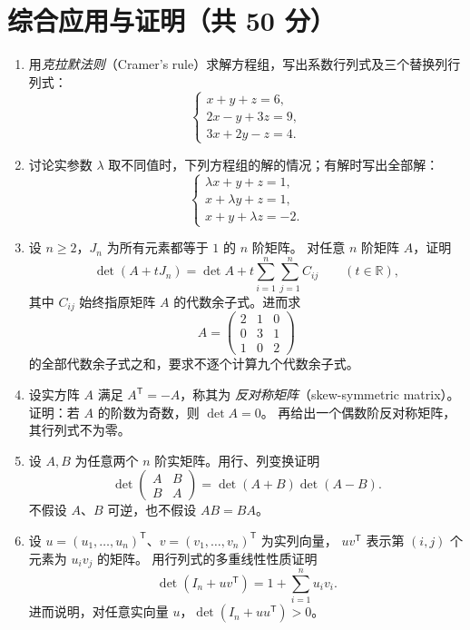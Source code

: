 \documentclass[UTF8,12pt,a4paper,fontset=fandol]{ctexart}
\begin{document}
\section{综合应用与证明（共 50 分）}
\begin{enumerate}[label=\arabic*.,resume=detquestions]

\item\label{q:cramer}
用\emph{克拉默法则}（Cramer's rule）求解方程组，写出系数行列式及三个替换列行列式：
\[
\begin{cases}
x+y+z=6,\\
2x-y+3z=9,\\
3x+2y-z=4.
\end{cases}
\]

\item\label{q:parameter-system}
讨论实参数 $\lambda$ 取不同值时，下列方程组的解的情况；有解时写出全部解：
\[
\begin{cases}
\lambda x+y+z=1,\\
x+\lambda y+z=1,\\
x+y+\lambda z=-2.
\end{cases}
\]

\item\label{q:all-cofactors}
设 $n\geq2$，$J_n$ 为所有元素都等于 $1$ 的 $n$ 阶矩阵。
对任意 $n$ 阶矩阵 $A$，证明
\[
\det(A+tJ_n)=\det A+t\sum_{i=1}^n\sum_{j=1}^n C_{ij}
\qquad(t\in\mathbb R),
\]
其中 $C_{ij}$ 始终指原矩阵 $A$ 的代数余子式。进而求
\[
A=\begin{pmatrix}2&1&0\\0&3&1\\1&0&2\end{pmatrix}
\]
的全部代数余子式之和，要求不逐个计算九个代数余子式。

\item\label{q:skew-symmetric}
设实方阵 $A$ 满足 $A^{\mathsf T}=-A$，称其为
\emph{反对称矩阵}（skew-symmetric matrix）。
证明：若 $A$ 的阶数为奇数，则 $\det A=0$。
再给出一个偶数阶反对称矩阵，其行列式不为零。

\item\label{q:block-determinant}
设 $A,B$ 为任意两个 $n$ 阶实矩阵。用行、列变换证明
\[
\det\begin{pmatrix}A&B\\B&A\end{pmatrix}
=\det(A+B)\det(A-B).
\]
不假设 $A$、$B$ 可逆，也不假设 $AB=BA$。

\item\label{q:rank-one}
设 $u=(u_1,\ldots,u_n)^{\mathsf T}$、$v=(v_1,\ldots,v_n)^{\mathsf T}$ 为实列向量，
$uv^{\mathsf T}$ 表示第 $(i,j)$ 个元素为 $u_iv_j$ 的矩阵。
用行列式的多重线性性质证明
\[
\det(I_n+uv^{\mathsf T})=1+\sum_{i=1}^n u_iv_i.
\]
进而说明，对任意实向量 $u$，$\det(I_n+uu^{\mathsf T})>0$。


\end{enumerate}
\end{document}
